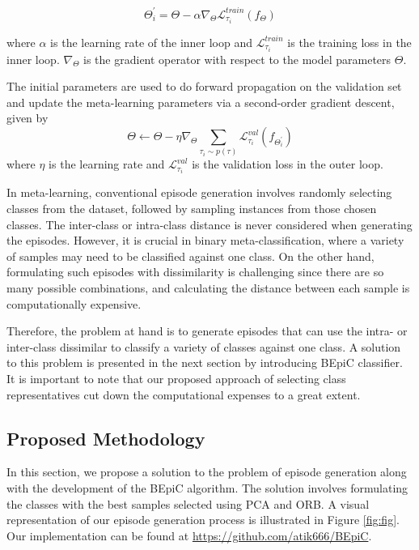 \begin{equation}\label{eq:meta_update1}
    \Theta _{i}^{'}= \Theta-\alpha\nabla_{\Theta}\mathcal{L}_{\tau _{i}}^{train}(f_{\Theta})
\end{equation}

where $\alpha$ is the learning rate of the inner loop and $\mathcal{L}_{\tau _{i}}^{train}$ is the training loss in the inner loop. $\nabla_{\Theta}$ is the gradient operator with respect to the model parameters $\Theta$.

The initial parameters are used to do forward propagation on the validation set and update the meta-learning parameters via a second-order gradient descent, given by
\begin{equation}\label{eq:meta_update2}
    \Theta \leftarrow \Theta-\eta \nabla_{\Theta} \sum_{\tau_{i}\sim p(\tau) } \mathcal{L}_{\tau _{i}}^{val}(f_{\Theta_{i}^{'}})
\end{equation}
where $\eta$ is the learning rate and $\mathcal{L}_{\tau _{i}}^{val}$ is the validation loss in the outer loop.

In meta-learning, conventional episode generation involves randomly selecting classes from the dataset, followed by sampling instances from those chosen classes. The inter-class or intra-class distance is never considered when generating the episodes. However, it is crucial in binary meta-classification, where a variety of samples may need to be classified against one class. On the other hand, formulating such episodes with dissimilarity is challenging since there are so many possible combinations, and calculating the distance between each sample is computationally expensive. 

Therefore, the problem at hand is to generate episodes that can use the intra- or inter-class dissimilar to classify a variety of classes against one class. A solution to this problem is presented in the next section by introducing BEpiC classifier. It is important to note that our proposed approach of selecting class representatives cut down the computational expenses to a great extent.

\subsection{Proposed Methodology}

In this section, we propose a solution to the problem of episode generation along with the development of the BEpiC algorithm. The solution involves formulating the classes with the best samples selected using PCA and ORB. A visual representation of our episode generation process is illustrated in Figure \ref{fig:fig}. Our implementation can be found at \href{https://github.com/atik666/BEpiC}{https://github.com/atik666/BEpiC}.

